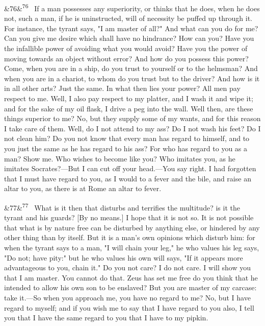 \documentclass[12pt]{article}
\newcommand{\para}[1][]{\par\noindent\ifx&#1&\else\textsuperscript{\footnotesize #1}~\fi}
\begin{document}
\para[76] If a man possesses any superiority, or thinks that he does, when he does not, such a man, if he is uninstructed, will of necessity be puffed up through it. For instance, the tyrant says, "I am master of all?" And what can you do for me? Can you give me desire which shall have no hindrance? How can you? Have you the infallible power of avoiding what you would avoid? Have you the power of moving towards an object without error? And how do you possess this power? Come, when you are in a ship, do you trust to yourself or to the helmsman? And when you are in a chariot, to whom do you trust but to the driver? And how is it in all other arts? Just the same. In what then lies your power? All men pay respect to me. Well, I also pay respect to my platter, and I wash it and wipe it; and for the sake of my oil flask, I drive a peg into the wall. Well then, are these things superior to me? No, but they supply some of my wants, and for this reason I take care of them. Well, do I not attend to my ass? Do I not wash his feet? Do I not clean him? Do you not know that every man has regard to himself, and to you just the same as he has regard to his ass? For who has regard to you as a man? Show me. Who wishes to become like you? Who imitates you, as he imitates Socrates?—But I can cut off your head.—You say right. I had forgotten that I must have regard to you, as I would to a fever and the bile, and raise an altar to you, as there is at Rome an altar to fever.

\para[77] What is it then that disturbs and terrifies the multitude? is it the tyrant and his guards? [By no means.] I hope that it is not so. It is not possible that what is by nature free can be disturbed by anything else, or hindered by any other thing than by itself. But it is a man's own opinions which disturb him: for when the tyrant says to a man, "I will chain your leg," he who values his leg says, "Do not; have pity:" but he who values his own will says, "If it appears more advantageous to you, chain it." Do you not care? I do not care. I will show you that I am master. You cannot do that. Zeus has set me free do you think that he intended to allow his own son to be enslaved? But you are master of my carcase: take it.—So when you approach me, you have no regard to me? No, but I have regard to myself; and if you wish me to say that I have regard to you also, I tell you that I have the same regard to you that I have to my pipkin.
\end{document}
